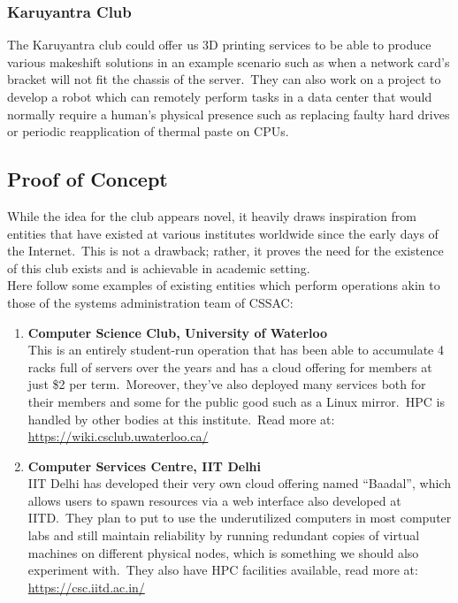 \documentclass[a4paper,11pt,twocolumn,oneside]{book}
\begin{document}
    \subsubsection{Karuyantra Club}
    The Karuyantra club could offer us 3D printing services to be able to produce various makeshift solutions in an
    example scenario such as when a network card's bracket will not fit the chassis of the server.\ They can also
    work on a project to develop a robot which can remotely perform tasks in a data center that would normally require a
    human's physical presence such as replacing faulty hard drives or periodic reapplication of thermal paste on CPUs.


    \subsection{Proof of Concept}\label{subsec:proof-of-concept}

    While the idea for the club appears novel, it heavily draws inspiration from entities that have existed at various
    institutes worldwide since the early days of the Internet.\ This is not a drawback; rather, it proves the need for
    the existence of this club exists and is achievable in academic setting.
    \\
    Here follow some examples of existing entities which perform operations akin to those of the systems administration
    team of CSSAC:

    \begin{enumerate}
        \item \textbf{Computer Science Club, University of Waterloo}\\
        This is an entirely student-run operation that has been able to accumulate 4 racks full of servers over the
        years and has a cloud offering for members at just \$2 per term.\ Moreover, they've also deployed many services
        both for their members and some for the public good such as a Linux mirror.\ HPC is handled by other bodies at
        this institute.\ Read more at:\\
        \href{https://wiki.csclub.uwaterloo.ca/}{\color{blue}\url{https://wiki.csclub.uwaterloo.ca/}}

        \item \textbf{Computer Services Centre, IIT Delhi}\\
        IIT Delhi has developed their very own cloud offering named ``Baadal'', which allows users to spawn resources
        via a web interface also developed at IITD.\ They plan to put to use the underutilized computers in most
        computer labs and still maintain reliability by running redundant copies of virtual machines on different
        physical nodes, which is something we should also experiment with.\ They also have HPC facilities available,
        read more at:\\
        \href{https://csc.iitd.ac.in/}{\color{blue}\url{https://csc.iitd.ac.in/}}
    \end{enumerate}
\end{document}
